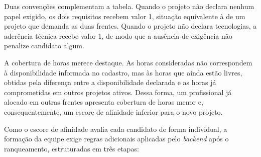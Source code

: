 \begin{table}[htbp]
\centering
\caption{Obtenção das variáveis de entrada do modelo a partir dos dados do sistema}
\label{tab:vetor}
\end{table}

Duas convenções complementam a tabela. Quando o projeto não declara nenhum papel exigido, os dois requisitos recebem valor 1, situação equivalente à de um projeto que demanda as duas frentes. Quando o projeto não declara tecnologias, a aderência técnica recebe valor 1, de modo que a ausência de exigência não penalize candidato algum.

A cobertura de horas merece destaque. As horas consideradas não correspondem à disponibilidade informada no cadastro, mas às horas que ainda estão livres, obtidas pela diferença entre a disponibilidade declarada e as horas já comprometidas em outros projetos ativos. Dessa forma, um profissional já alocado em outras frentes apresenta cobertura de horas menor e, consequentemente, um escore de afinidade inferior para o novo projeto.

Como o escore de afinidade avalia cada candidato de forma individual, a formação da equipe exige regras adicionais aplicadas pelo \textit{backend} após o ranqueamento, estruturadas em três etapas:

